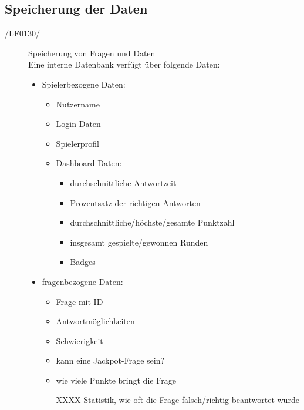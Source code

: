 \documentclass[11pt,a4paper]{scrreprt}
\begin{document}
\subsection{Speicherung der Daten}
\begin{description}
\item[/LF0130/] Speicherung von Fragen und Daten \\
Eine interne Datenbank verfügt über folgende Daten:
	\begin{itemize}
	\item Spielerbezogene Daten:
		\begin{itemize}
		\item Nutzername
		\item Login-Daten
		\item Spielerprofil
		\item Dashboard-Daten:
			\begin{itemize}
			\item durchschnittliche Antwortzeit
			\item Prozentsatz der richtigen Antworten
			\item durchschnittliche/höchste/gesamte Punktzahl
			\item insgesamt gespielte/gewonnen Runden
			\item Badges
			\end{itemize}
		\end{itemize}
	\item fragenbezogene Daten:
		\begin{itemize}
		\item Frage mit ID
		\item Antwortmöglichkeiten
		\item Schwierigkeit
		\item kann eine Jackpot-Frage sein?
		\item wie viele Punkte bringt die Frage
		\item[XXXX] Statistik, wie oft die Frage falsch/richtig beantwortet wurde
		\end{itemize}
	\end{itemize}
\end{description}
\end{document}
